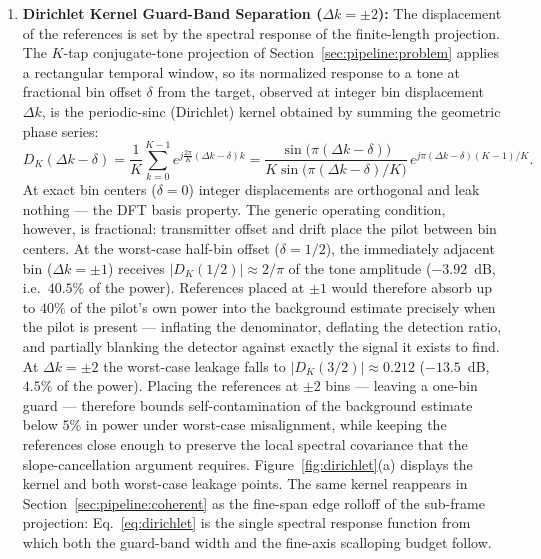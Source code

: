 \begin{enumerate}
    \item \textbf{Dirichlet Kernel Guard-Band Separation ($\Delta k = \pm 2$):} The displacement of the references is set by the spectral response of the finite-length projection. The $K$-tap conjugate-tone projection of Section~\ref{sec:pipeline:problem} applies a rectangular temporal window, so its normalized response to a tone at fractional bin offset $\delta$ from the target, observed at integer bin displacement $\Delta k$, is the periodic-sinc (Dirichlet) kernel obtained by summing the geometric phase series:
    \begin{equation}
    \label{eq:dirichlet}
    D_K(\Delta k - \delta) = \frac{1}{K} \sum_{k=0}^{K-1} e^{j \frac{2\pi}{K} (\Delta k - \delta) k}
    = \frac{\sin\!\big(\pi (\Delta k - \delta)\big)}{K \sin\!\big(\pi (\Delta k - \delta) / K\big)} \, e^{j\pi(\Delta k - \delta)(K-1)/K}.
    \end{equation}
    At exact bin centers ($\delta = 0$) integer displacements are orthogonal and leak nothing --- the DFT basis property. The generic operating condition, however, is fractional: transmitter offset and drift place the pilot between bin centers. At the worst-case half-bin offset ($\delta = 1/2$), the immediately adjacent bin ($\Delta k = \pm 1$) receives $|D_K(1/2)| \approx 2/\pi$ of the tone amplitude ($-3.92$~dB, i.e.\ $40.5\%$ of the power). References placed at $\pm 1$ would therefore absorb up to $40\%$ of the pilot's own power into the background estimate precisely when the pilot is present --- inflating the denominator, deflating the detection ratio, and partially blanking the detector against exactly the signal it exists to find. At $\Delta k = \pm 2$ the worst-case leakage falls to $|D_K(3/2)| \approx 0.212$ ($-13.5$~dB, $4.5\%$ of the power). Placing the references at $\pm 2$ bins --- leaving a one-bin guard --- therefore bounds self-contamination of the background estimate below $5\%$ in power under worst-case misalignment, while keeping the references close enough to preserve the local spectral covariance that the slope-cancellation argument requires. Figure~\ref{fig:dirichlet}(a) displays the kernel and both worst-case leakage points. The same kernel reappears in Section~\ref{sec:pipeline:coherent} as the fine-span edge rolloff of the sub-frame projection: Eq.~\eqref{eq:dirichlet} is the single spectral response function from which both the guard-band width and the fine-axis scalloping budget follow.
\end{enumerate}

